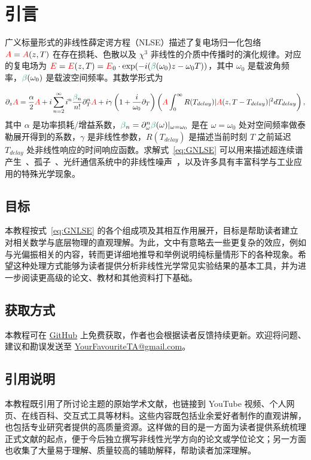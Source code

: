 \chapter{引言}
\label{ch:Introduction}
广义标量形式的非线性薛定谔方程（NLSE）描述了复电场归一化包络 $\textcolor{red}{A}=\textcolor{red}{A}(z,T)$ 在存在损耗、色散以及 $\chi^3$ 非线性的介质中传播时的演化规律。对应的复电场为 $\E=\E(z,T)=\E_0\cdot \exp(-i(\betag(\omega_0)z-\omega_0T))$，其中 $\omega_0$ 是载波角频率，$\betag(\omega_0)$ 是载波空间频率。其数学形式为

\begin{align}
    \label{eq:GNLSE}
    \partial_z \A = \frac{\alpha}{2}\A+i \sum_{n=2}^{\infty}i^n \frac{\betag_n}{n!}\partial_T^n\A  + i\gamma\left(1+\frac{i}{\omega_0}\partial_T  \right)\left(
\A \int_{0}^{\infty} R(T_{delay})|\A(z,T-T_{delay})|^2 dT_{delay} \right),
\end{align}
其中 $\alpha$ 是功率损耗/增益系数，$\betag_n=\partial_\omega^n\betag(\omega)|_{\omega=\omega_0}$ 是在 $\omega=\omega_0$ 处对空间频率做泰勒展开得到的系数，$\gamma$ 是非线性参数，$R(T_{delay})$ 是描述当前时刻 $T$ 之前延迟 $T_{delay}$ 处非线性响应的时间响应函数。求解式~\ref{eq:GNLSE} 可以用来描述超连续谱产生~\cite{supercontinuum_original_paper,NLSE_original}、孤子~\cite{soliton_first_theory,Soliton_experimental_first}、光纤通信系统中的非线性噪声~\cite{poggiolini2014detailedanalyticalderivationgn}，以及许多具有丰富科学与工业应用的特殊光学现象。

\section{目标}
本教程按式~\ref{eq:GNLSE} 的各个组成项及其相互作用展开，目标是帮助读者建立对相关数学与底层物理的直观理解。为此，文中有意略去一些更复杂的效应，例如与光偏振相关的内容，转而更详细地推导和举例说明纯标量情形下的各种现象。希望这种处理方式能够为读者提供分析非线性光学常见实验结果的基本工具，并为进一步阅读更高级的论文、教材和其他资料打下基础。

\section{获取方式}
本教程可在 \href{https://github.com/OleKrarup123/NLSE-primer}{GitHub} 上免费获取，作者也会根据读者反馈持续更新。欢迎将问题、建议和勘误发送至 \href{yourfavouriteta@gmail.com}{YourFavouriteTA@gmail.com}。


\section{引用说明}
本教程既引用了所讨论主题的原始学术文献，也链接到 YouTube 视频、个人网页、在线百科、交互式工具等材料。这些内容既包括业余爱好者制作的直观讲解，也包括专业研究者提供的高质量资源。这样做的目的是一方面为读者提供系统梳理正式文献的起点，便于今后独立撰写非线性光学方向的论文或学位论文；另一方面也收集了大量易于理解、质量较高的辅助解释，帮助读者加深理解。

